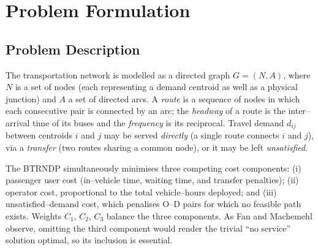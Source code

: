 \documentclass [a4paper, 11pt, titlepage] {article}
\begin{document}
\section{Problem Formulation}
\label{problem_formulation}

\subsection{Problem Description}
The transportation network is modelled as a directed graph $G=(N,A)$, where $N$
is a set of nodes (each representing a demand centroid as well as a physical
junction) and $A$ a set of directed arcs. A \emph{route} is a sequence of nodes
in which each consecutive pair is connected by an arc; the \emph{headway} of a
route is the inter--arrival time of its buses and the \emph{frequency} is its
reciprocal. Travel demand $d_{ij}$ between centroids $i$ and $j$ may be served
\emph{directly} (a single route connects $i$ and $j$), via a \emph{transfer}
(two routes sharing a common node), or it may be left \emph{unsatisfied}.

The BTRNDP simultaneously minimises three competing cost components:
(i) passenger user cost (in--vehicle time, waiting time, and transfer
penalties); (ii) operator cost, proportional to the total vehicle--hours
deployed; and (iii) unsatisfied--demand cost, which penalises O--D pairs for
which no feasible path exists. Weights $C_1$, $C_2$, $C_3$ balance the three
components. As Fan and Machemehl \cite{fan2006} observe, omitting the third
component would render the trivial ``no service'' solution optimal, so its
inclusion is essential.
\end{document}
